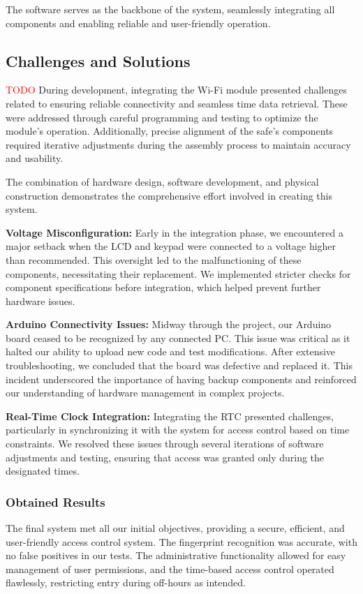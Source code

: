 \documentclass{article}
\begin{document}
The software serves as the backbone of the system, seamlessly integrating all components and enabling reliable and user-friendly operation.


\subsection{Challenges and Solutions} \textcolor{red}{TODO}
During development, integrating the Wi-Fi module presented challenges related to ensuring reliable connectivity and seamless time data retrieval. These were addressed through careful programming and testing to optimize the module's operation. Additionally, precise alignment of the safe's components required iterative adjustments during the assembly process to maintain accuracy and usability.

The combination of hardware design, software development, and physical construction demonstrates the comprehensive effort involved in creating this system.

\textbf{Voltage Misconfiguration:} Early in the integration phase, we encountered a major setback when the LCD and keypad were connected to a voltage higher than recommended. This oversight led to the malfunctioning of these components, necessitating their replacement. We implemented stricter checks for component specifications before integration, which helped prevent further hardware issues.

\textbf{Arduino Connectivity Issues:} Midway through the project, our Arduino board ceased to be recognized by any connected PC. This issue was critical as it halted our ability to upload new code and test modifications. After extensive troubleshooting, we concluded that the board was defective and replaced it. This incident underscored the importance of having backup components and reinforced our understanding of hardware management in complex projects.

\textbf{Real-Time Clock Integration:} Integrating the RTC presented challenges, particularly in synchronizing it with the system for access control based on time constraints. We resolved these issues through several iterations of software adjustments and testing, ensuring that access was granted only during the designated times.

\subsubsection{Obtained Results}
The final system met all our initial objectives, providing a secure, efficient, and user-friendly access control system. The fingerprint recognition was accurate, with no false positives in our tests. The administrative functionality allowed for easy management of user permissions, and the time-based access control operated flawlessly, restricting entry during off-hours as intended.
\end{document}
